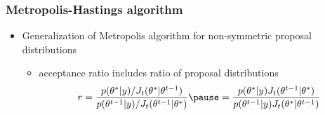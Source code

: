 \documentclass[10pt]{beamer}
\begin{document}
\begin{frame}

\frametitle{ Metropolis-Hastings algorithm}

  \begin{itemize}
  \item Generalization of Metropolis algorithm for non-symmetric proposal distributions
    \begin{itemize}
    \item acceptance ratio includes ratio of proposal distributions
      \begin{equation*}
        r =
        \frac{p(\theta^{*}|y)/J_t(\theta^{*}|\theta^{t-1})}{p(\theta^{t-1}|y)/J_t(\theta^{t-1}|\theta^{*})} \pause =
        \frac{p(\theta^{*}|y)J_t(\theta^{t-1}|\theta^{*})}{p(\theta^{t-1}|y)J_t(\theta^{*}|\theta^{t-1})}
      \end{equation*}
    \end{itemize}
  \end{itemize}

\end{frame}




\end{document}
